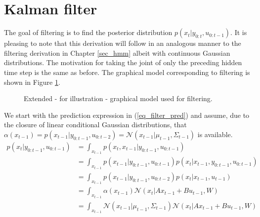 \section{Kalman filter}
\label{sec_kalman_filter_deriv}
The goal of filtering is to find the posterior distribution $p(x_{t}|y_{0:t}, u_{0:t-1})$. It is pleasing to note that this derivation will follow in an analogous manner to the filtering derivation in Chapter \ref{sec_hmm} albeit with continuous Gaussian distributions. The motivation for taking the joint of only the preceding hidden time step is the same as before. The graphical model corresponding to filtering is shown in Figure \ref{fig_gm_linmods_filtering}.
\begin{figure}[H] 
\centering
{}
\caption{Extended - for illustration - graphical model used for filtering.}
\label{fig_gm_linmods_filtering}
\end{figure}
We start with the prediction expression in (\ref{eq_filter_pred}) and assume, due to the closure of linear conditional Gaussian distributions, that $\alpha(x_{t-1}) = p(x_{t-1}|y_{0:t-1}, u_{0:t-2}) = \mathcal{N}(x_{t-1}|\mu_{t-1}, \Sigma_{t-1}) $ is available. 
\begin{equation}
\begin{aligned}
p(x_t|y_{0:t-1}, u_{0:t-1}) &= \int_{x_{t-1}} p(x_t,x_{t-1}|y_{0:t-1}, u_{0:t-1}) \\
&= \int_{x_{t-1}} p(x_{t-1}|y_{0:t-1}, u_{0:t-1})p(x_{t}|x_{t-1}, y_{0:t-1}, u_{0:t-1}) \\
&= \int_{x_{t-1}} p(x_{t-1}|y_{0:t-1}, u_{0:t-2})p(x_{t}|x_{t-1}, u_{t-1}) \\
&= \int_{x_{t-1}} \alpha(x_{t-1})\mathcal{N}(x_{t}|Ax_{t-1}+Bu_{t-1}, W) \\
&= \int_{x_{t-1}} \mathcal{N}(x_{t-1}|\mu_{t-1}, \Sigma_{t-1}) \mathcal{N}(x_{t}|Ax_{t-1}+Bu_{t-1}, W) \\
\end{aligned}
\label{eq_filter_pred}
\end{equation} 
